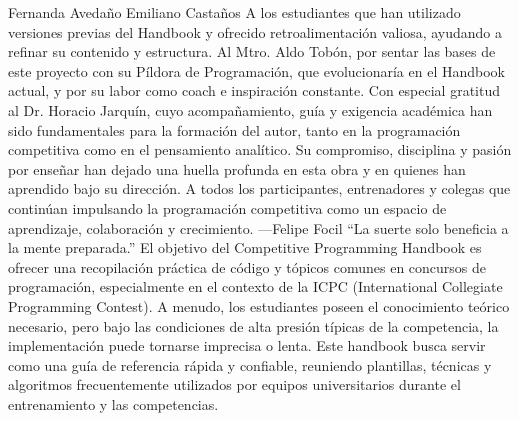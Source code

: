 \markdownRendererUlItem Fernanda Avedaño\markdownRendererUlItemEnd 
\markdownRendererUlItem Emiliano Castaños\markdownRendererUlItemEnd 
\markdownRendererUlEndTight \markdownRendererInterblockSeparator
{}
\markdownRendererSectionEnd 
\markdownRendererSectionEnd \markdownRendererSectionBegin
{}\markdownRendererInterblockSeparator
{}A los estudiantes que han utilizado versiones previas del Handbook y ofrecido retroalimentación valiosa, ayudando a refinar su contenido y estructura.\markdownRendererParagraphSeparator
{}Al Mtro. Aldo Tobón, por sentar las bases de este proyecto con su Píldora de Programación, que evolucionaría en el Handbook actual, y por su labor como coach e inspiración constante.\markdownRendererParagraphSeparator
{}Con especial gratitud al Dr. Horacio Jarquín, cuyo acompañamiento, guía y exigencia académica han sido fundamentales para la formación del autor, tanto en la programación competitiva como en el pensamiento analítico. Su compromiso, disciplina y pasión por enseñar han dejado una huella profunda en esta obra y en quienes han aprendido bajo su dirección.\markdownRendererParagraphSeparator
{}A todos los participantes, entrenadores y colegas que continúan impulsando la programación competitiva como un espacio de aprendizaje, colaboración y crecimiento.\markdownRendererParagraphSeparator
{}—Felipe Focil\markdownRendererParagraphSeparator
{}“La suerte solo beneficia a la mente preparada.”\markdownRendererInterblockSeparator
{}
\markdownRendererSectionEnd 
\markdownRendererSectionEnd \markdownRendererSectionBegin
{}\markdownRendererInterblockSeparator
{}El objetivo del Competitive Programming Handbook es ofrecer una recopilación práctica de código y tópicos comunes en concursos de programación, especialmente en el contexto de la ICPC (International Collegiate Programming Contest).\markdownRendererParagraphSeparator
{}A menudo, los estudiantes poseen el conocimiento teórico necesario, pero bajo las condiciones de alta presión típicas de la competencia, la implementación puede tornarse imprecisa o lenta.\markdownRendererParagraphSeparator
{}Este handbook busca servir como una guía de referencia rápida y confiable, reuniendo plantillas, técnicas y algoritmos frecuentemente utilizados por equipos universitarios durante el entrenamiento y las competencias.
\markdownRendererSectionEnd \markdownRendererDocumentEnd